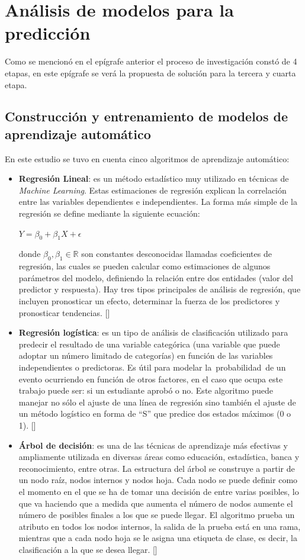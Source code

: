 \section{Análisis de modelos para la predicción}

Como se mencionó en el epígrafe anterior el proceso de investigación constó de 4 etapas, en este epígrafe se verá la propuesta de solución para la tercera y cuarta etapa.

\subsection{Construcción y entrenamiento de modelos de aprendizaje automático}

En este estudio se tuvo en cuenta cinco algoritmos de aprendizaje automático:

\begin{itemize}
    \item \textbf{Regresión Lineal}: es un método estadístico muy utilizado en técnicas de \textit{Machine Learning}. Estas estimaciones de regresión explican la correlación entre las variables dependientes e independientes. La forma más simple de la regresión se define mediante la siguiente ecuación:
    \begin{center}
        $Y = \beta_0 + \beta_1X + \epsilon$
    \end{center}
    donde $\beta_0, \beta_1 \in \mathbb{R}$ son constantes desconocidas llamadas coeficientes de regresión, las cuales se pueden calcular como estimaciones de algunos parámetros del modelo, definiendo la relación entre dos entidades (valor del predictor y respuesta). Hay tres tipos principales de análisis de regresión, que incluyen pronosticar un efecto, determinar la fuerza de los predictores y pronosticar tendencias. [\cite{faul2019concise}]
    \item \textbf{Regresión logística}: es un tipo de análisis de clasificación utilizado para predecir el resultado de una variable categórica (una variable que puede adoptar un número limitado de categorías) en función de las variables independientes o predictoras. Es útil para modelar la probabilidad de un evento ocurriendo en función de otros factores, en el caso que ocupa este trabajo puede ser: si un estudiante aprobó o no. Este algoritmo puede manejar no sólo el ajuste de una línea de regresión sino también el ajuste de un método logístico en forma de ``S'' que predice dos estados máximos (0 o 1). [\cite{wei-meng2019python}]
    \item \textbf{Árbol de decisión}: es una de las técnicas de aprendizaje más efectivas y ampliamente utilizada en diversas áreas como educación, estadística, banca y reconocimiento, entre otras. La estructura del árbol se construye a partir de un nodo raíz, nodos internos y nodos hoja. Cada nodo se puede definir como el momento en el que se ha de tomar una decisión de entre varias posibles, lo que va haciendo que a medida que aumenta el número de nodos aumente el número de posibles finales a los que se puede llegar. El algoritmo prueba un atributo en todos los nodos internos, la salida de la prueba está en una rama, mientras que a cada nodo hoja se le asigna una etiqueta de clase, es decir, la clasificación a la que se desea llegar. [\cite{faul2019concise}]

\end{itemize}
